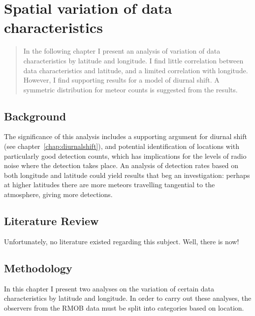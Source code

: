 \chapter{Spatial variation of data characteristics}
\label{chap:spatial}
\begin{strip}
	\begin{minipage}{\textwidth}
		\begin{abstract}
			In the following chapter I present an analysis of variation of data characteristics by latitude and longitude. I find little correlation between data characteristics and latitude, and a limited correlation with longitude. However, I find supporting results for a model of diurnal shift. A symmetric distribution for meteor counts is suggested from the results.
		\end{abstract}
	\end{minipage}
\end{strip}
\section{Background}
The significance of this analysis includes a supporting argument for diurnal shift (see chapter~\ref{chap:diurnalshift}), and potential identification of locations with particularly good detection counts, which has implications for the levels of radio noise where the detection takes place. An analysis of detection rates based on both longitude and latitude could yield results that beg an investigation: perhaps at higher latitudes there are more meteors travelling tangential to the atmosphere, giving more detections.
\section{Literature Review}
Unfortunately, no literature existed regarding this subject. Well, there is now!
\section{Methodology}
In this chapter I present two analyses on the variation of certain data characteristics by latitude and longitude. In order to carry out these analyses, the observers from the RMOB data must be split into categories based on location.
